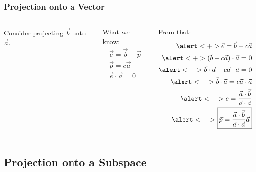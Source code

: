 \documentclass[12pt]{beamer}
\begin{document}
\begin{frame}
    \frametitle{Projection onto a Vector}

    \begin{columns}
        Consider projecting $\vec{b}$ onto $\vec{a}$.


        \pause

        What we know:
        \begin{align*}
            \vec{e} = \vec{b} - \vec{p} \\
            \vec{p} = c \vec{a}         \\
            \vec{e} \cdot \vec{a} = 0
        \end{align*}


        \pause
        From that:
        \begin{align*}
            \alert<+>{\vec{e} = \vec{b} - c \vec{a}                          } \\
            \alert<+>{(\vec{b} - c \vec{a}) \cdot \vec{a} = 0                } \\
            \alert<+>{\vec{b} \cdot \vec{a} - c \vec{a} \cdot \vec{a} = 0    } \\
            \alert<+>{\vec{b} \cdot \vec{a} = c \vec{a} \cdot \vec{a}        } \\
            \alert<+>{c = \frac{\vec{a} \cdot \vec{b}}{\vec{a} \cdot \vec{a}}} \\
            \alert<+>{\boxed{\vec{p} = \frac{\vec{a} \cdot \vec{b}}{\vec{a} \cdot \vec{a}} \vec{a}}}
        \end{align*}
    \end{columns}
\end{frame}

\subsection{Projection onto a Subspace}
\end{document}
